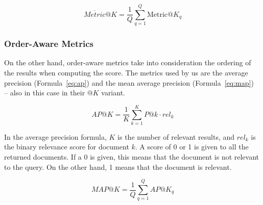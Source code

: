 \begin{equation}
    \text{$\overline{Metric}$}@K = \frac{1}{Q}\sum_{q=1}^Q \text{Metric}@K_q
    \label{eq:overall}
\end{equation}

\subsubsection{Order-Aware Metrics}
On the other hand, order-aware metrics take into consideration the ordering of the results when computing the score.
The metrics used by us are the average precision (Formula~\ref{eq:ap}) and the mean average precision (Formula~\ref{eq:map})~\cite{yilmaz_new_2008} -- also in this case in their $@K$ variant.

\begin{equation}
    AP@K = \frac{1}{K} \sum_{k=1}^{K} P@k \cdot rel_k
    \label{eq:ap}
\end{equation}

\noindent In the average precision formula, $K$ is the number of relevant results, and $rel_k$ is the binary relevance score for document $k$.
A score of 0 or 1 is given to all the returned documents.
If a 0 is given, this means that the document is not relevant to the query.
On the other hand, 1 means that the document is relevant.

\begin{equation}
    MAP@K = \frac{1}{Q} \sum_{q=1}^{Q} AP@K_q
    \label{eq:map}
\end{equation}